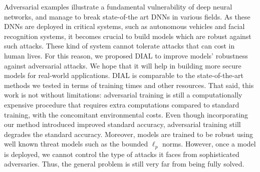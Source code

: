 Adversarial examples illustrate a fundamental vulnerability of deep neural networks, and manage to break state-of-the art DNNs in various fields. As these DNNs are deployed in critical systems, such as autonomous vehicles and facial recognition systems, it becomes crucial to build models which are robust against such attacks. These kind of system cannot tolerate attacks that can cost in human lives.
For this reason, we proposed DIAL to improve models' robustness against adversarial attacks.
We hope that it will help in building more secure models for real-world applications.  DIAL 
is comparable 
to the state-of-the-art methods we tested
in terms of training times and other
resources.
That said, this work is not without limitations: adversarial training is still a computationally expensive procedure that requires extra computations compared to standard training, 
with the concomitant environmental costs.
Even though incorporating our method introduced improved standard accuracy, adversarial training still degrades the standard accuracy. 
Moreover, models are trained to be robust using well known threat models such as the bounded $\ell_{p}$ norms. However, once a model is deployed, we cannot control the type of attacks it faces from sophisticated adversaries. Thus, the general problem
is still very far from being fully solved.
